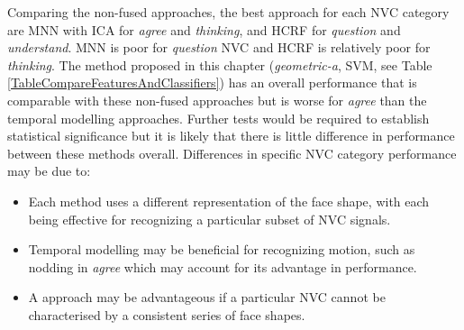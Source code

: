 Comparing the non-fused approaches, the best approach for each \ac{NVC} category are MNN with ICA for \textit{agree} and \textit{thinking}, and HCRF for \textit{question} and \textit{understand}. MNN is poor for \textit{question} \ac{NVC} and HCRF is relatively poor for \textit{thinking}. The method proposed in this chapter (\textit{geometric-a}, SVM, see Table \ref{TableCompareFeaturesAndClassifiers}) has an overall performance that is comparable with these non-fused approaches but is worse for \textit{agree} than the temporal modelling approaches. Further tests would be required to establish statistical significance but it is likely that there is little difference in performance between these methods overall. Differences in specific \ac{NVC} category performance may be due to:
\begin{itemize}
 \item Each method uses a different representation of the face shape, with each being effective for recognizing a particular subset of \ac{NVC} signals.
 \item Temporal modelling may be beneficial for recognizing motion, such as nodding in \textit{agree} which may account for its advantage in performance.
 \item A \featureGeneration approach may be advantageous if a particular \ac{NVC} cannot be characterised by a consistent series of face shapes.
\end{itemize}

